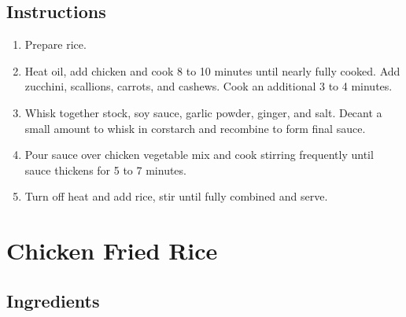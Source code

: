 \documentclass[ansiapaper,10pt,english]{sphinxmanual}
\begin{document}
\section{Instructions}
\label{\detokenize{Cashew_cluck:instructions}}\begin{enumerate}
\item {} 
Prepare rice.

\item {} 
Heat oil, add chicken and cook 8 to 10 minutes until nearly fully cooked.  Add zucchini, scallions, carrots, and cashews.  Cook an additional 3 to 4 minutes.

\item {} 
Whisk together stock, soy sauce, garlic powder, ginger, and salt.  Decant a small amount to whisk in corstarch and recombine to form final sauce.

\item {} 
Pour sauce over chicken vegetable mix and cook stirring frequently until sauce thickens for 5 to 7 minutes.

\item {} 
Turn off heat and add rice, stir until fully combined and serve.

\end{enumerate}


\chapter{Chicken Fried Rice}
\label{\detokenize{Cluck_FR:chicken-fried-rice}}\label{\detokenize{Cluck_FR::doc}}

\section{Ingredients}
\label{\detokenize{Cluck_FR:ingredients}}
%
\begin{sphinxVerbatim}[commandchars=\\\{\}]
    

   

   

  

       

   

  

   

   

    
\end{sphinxVerbatim}
\end{document}
